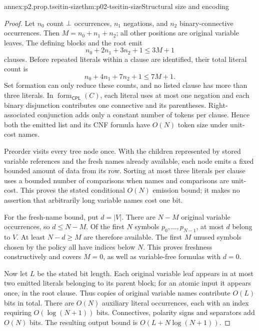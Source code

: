 \begin{annexitem}{annex:p2.prop.tseitin-size}{thm:p02-tseitin-size}{Structural size and encoding}
\begin{proof}
Let \(n_0\) count \(\bot\) occurrences, \(n_1\) negations, and
\(n_2\) binary-connective occurrences.  Then
\(M=n_0+n_1+n_2\); all other positions are original variable leaves.
The defining blocks and the root emit
\[
 n_0+2n_1+3n_2+1\leq3M+1
\]
clauses.  Before repeated literals within a clause are identified, their
total literal count is
\[
 n_0+4n_1+7n_2+1\leq7M+1.
\]
Set formation can only reduce these counts, and no listed clause has more
than three literals.  In \(\operatorname{form}_{\mathsf{CPL}}(C)\), each literal
uses at most one negation and each binary disjunction contributes one
connective and its parentheses.  Right-associated conjunction adds only a
constant number of tokens per clause.  Hence both the emitted list and its
CNF formula have \(O(N)\) token size under unit-cost names.

Preorder visits every tree node once.  With the children represented by stored
variable references and the fresh names already available, each node emits
a fixed bounded amount of data from its row.  Sorting at most three literals
per clause uses a bounded number of comparisons when names and comparisons
are unit-cost.  This proves the stated conditional \(O(N)\) emission bound;
it makes no assertion that arbitrarily long variable names cost one bit.

For the fresh-name bound, put \(d=|V|\).  There are \(N-M\) original
variable occurrences, so \(d\leq N-M\).  Of the first \(N\) symbols
\(p_0,\ldots,p_{N-1}\), at most \(d\) belong to \(V\).  At least
\(N-d\geq M\) are therefore available.  The first \(M\) unused symbols
chosen by the policy all have indices below \(N\).  This proves freshness
constructively and covers \(M=0\), as well as variable-free formulas with
\(d=0\).

Now let \(L\) be the stated bit length.  Each original variable leaf appears
in at most two emitted literals belonging to its parent block; for an atomic
input it appears once, in the root clause.  Thus copies of original variable
names contribute \(O(L)\) bits in total.  There are \(O(N)\) auxiliary
literal occurrences, each with an index requiring
\(O(\log(N+1))\) bits.  Connectives, polarity signs and separators add
\(O(N)\) bits.  The resulting output bound is
\(O(L+N\log(N+1))\).


\end{proof}
\end{annexitem}
